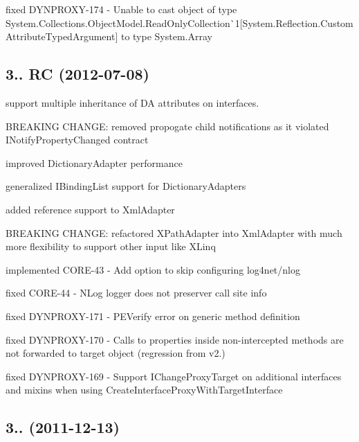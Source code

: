 \begin{DoxyItemize}
\item fixed D\+Y\+N\+P\+R\+O\+X\+Y-\/174 -\/ Unable to cast object of type \textquotesingle{}System.\+Collections.\+Object\+Model.\+Read\+Only\+Collection\`{}1\mbox{[}System.\+Reflection.\+Custom\+Attribute\+Typed\+Argument\mbox{]}\textquotesingle{} to type \textquotesingle{}System.\+Array\textquotesingle{}
\end{DoxyItemize}

\subsection*{3.. RC (2012-\/07-\/08)}


\begin{DoxyItemize}
\item support multiple inheritance of DA attributes on interfaces.
\item B\+R\+E\+A\+K\+I\+NG C\+H\+A\+N\+GE\+: removed propogate child notifications as it violated I\+Notify\+Property\+Changed contract
\item improved Dictionary\+Adapter performance
\item generalized I\+Binding\+List support for Dictionary\+Adapters
\item added reference support to Xml\+Adapter
\item B\+R\+E\+A\+K\+I\+NG C\+H\+A\+N\+GE\+: refactored X\+Path\+Adapter into Xml\+Adapter with much more flexibility to support other input like X\+Linq
\item implemented C\+O\+R\+E-\/43 -\/ Add option to skip configuring log4net/nlog
\item fixed C\+O\+R\+E-\/44 -\/ N\+Log logger does not preserver call site info
\item fixed D\+Y\+N\+P\+R\+O\+X\+Y-\/171 -\/ P\+E\+Verify error on generic method definition
\item fixed D\+Y\+N\+P\+R\+O\+X\+Y-\/170 -\/ Calls to properties inside non-\/intercepted methods are not forwarded to target object (regression from v2.)
\item fixed D\+Y\+N\+P\+R\+O\+X\+Y-\/169 -\/ Support I\+Change\+Proxy\+Target on additional interfaces and mixins when using Create\+Interface\+Proxy\+With\+Target\+Interface
\end{DoxyItemize}

\subsection*{3.. (2011-\/12-\/13)}


